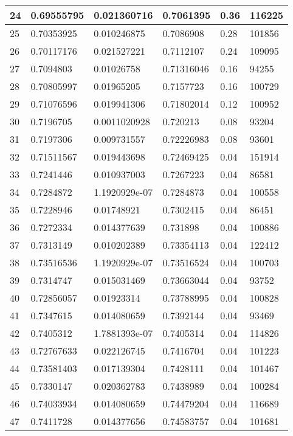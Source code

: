 \begin{longtable}{|l|l|l|l|l|l|}
24 & 0.69555795 & 0.021360716 & 0.7061395 & 0.36 & 116225 \\ \hline 
25 & 0.70353925 & 0.010246875 & 0.7086908 & 0.28 & 101856 \\ \hline 
26 & 0.70117176 & 0.021527221 & 0.7112107 & 0.24 & 109095 \\ \hline 
27 & 0.7094803 & 0.01026758 & 0.71316046 & 0.16 & 94255 \\ \hline 
28 & 0.70805997 & 0.01965205 & 0.7157723 & 0.16 & 100729 \\ \hline 
29 & 0.71076596 & 0.019941306 & 0.71802014 & 0.12 & 100952 \\ \hline 
30 & 0.7196705 & 0.0011020928 & 0.720213 & 0.08 & 93204 \\ \hline 
31 & 0.7197306 & 0.009731557 & 0.72226983 & 0.08 & 93601 \\ \hline 
32 & 0.71511567 & 0.019443698 & 0.72469425 & 0.04 & 151914 \\ \hline 
33 & 0.7241446 & 0.010937003 & 0.7267223 & 0.04 & 86581 \\ \hline 
34 & 0.7284872 & 1.1920929e-07 & 0.7284873 & 0.04 & 100558 \\ \hline 
35 & 0.7228946 & 0.01748921 & 0.7302415 & 0.04 & 86451 \\ \hline 
36 & 0.7272334 & 0.014377639 & 0.731898 & 0.04 & 100886 \\ \hline 
37 & 0.7313149 & 0.010202389 & 0.73354113 & 0.04 & 122412 \\ \hline 
38 & 0.73516536 & 1.1920929e-07 & 0.73516524 & 0.04 & 100703 \\ \hline 
39 & 0.7314747 & 0.015031469 & 0.73663044 & 0.04 & 93752 \\ \hline 
40 & 0.72856057 & 0.01923314 & 0.73788995 & 0.04 & 100828 \\ \hline 
41 & 0.7347615 & 0.014080659 & 0.7392144 & 0.04 & 93469 \\ \hline 
42 & 0.7405312 & 1.7881393e-07 & 0.7405314 & 0.04 & 114826 \\ \hline 
43 & 0.72767633 & 0.022126745 & 0.7416704 & 0.04 & 101223 \\ \hline 
44 & 0.73581403 & 0.017139304 & 0.7428111 & 0.04 & 101467 \\ \hline 
45 & 0.7330147 & 0.020362783 & 0.7438989 & 0.04 & 100284 \\ \hline 
46 & 0.74033934 & 0.014080659 & 0.74479204 & 0.04 & 116689 \\ \hline 
47 & 0.7411728 & 0.014377656 & 0.74583757 & 0.04 & 101681 \\ \hline 

\end{longtable}
